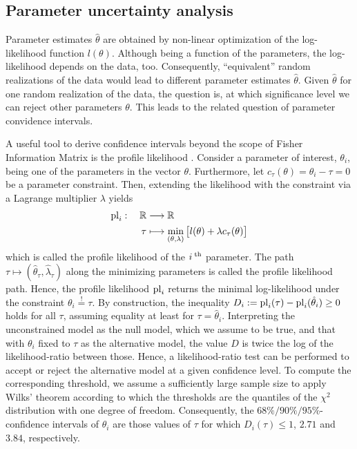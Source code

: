 \documentclass[article]{jss}
\begin{document}

\subsection{Parameter uncertainty analysis}

Parameter estimates $\hat \theta$  are obtained by non-linear optimization of the log-likelihood function $l(\theta)$. Although being a function of the parameters,  the log-likelihood depends on the data, too. Consequently, ``equivalent'' random realizations of the data would lead to different parameter estimates $\hat\theta$. Given $\hat\theta$ for one random realization of the data, the question is, at which significance level we can reject other parameters $\theta$. This leads to the related question of parameter convidence intervals.

A useful tool to derive confidence intervals beyond the scope of Fisher Information Matrix is the profile likelihood \citep{venzon1988method, murphy2000profile}. Consider a parameter of interest, $\theta_i$, being one of the parameters in the vector $\theta$. Furthermore, let $c_{\tau}(\theta) = \theta_i - \tau = 0$ be a parameter constraint.
Then, extending the likelihood with the constraint via a Lagrange multiplier $\lambda$ yields
\begin{align}
\begin{aligned}
{\rm pl}_i:\quad \mathbb R & \longrightarrow \mathbb R\\
\tau & \longmapsto \min_{(\theta, \lambda)} \big[ l(\theta) + \lambda c_{\tau}(\theta) \big]
\end{aligned}
\label{eq:pl}
\end{align}
which is called the profile likelihood of the $i^{\;\rm th}$ parameter. The path $\tau \mapsto (\hat\theta_{\tau}, \hat\lambda_{\tau})$ along the minimizing parameters is called the profile likelihood path. Hence, the profile likelihood ${\rm pl}_i$ returns the minimal log-likelihood under the constraint $\theta_i \stackrel{!}{=} \tau$. By construction, the inequality $D_i := {\rm pl}_i(\tau) - {\rm pl}_i(\hat \theta_i) \geq 0$ holds for all $\tau$, assuming equality at least for $\tau = \hat\theta_i$. Interpreting the unconstrained model as the null model, which we assume to be true, and that with $\theta_i$ fixed to $\tau$ as the alternative model, the value $D$ is twice the log of the likelihood-ratio between those. Hence, a likelihood-ratio test can be performed to accept or reject the alternative model at a given confidence level. To compute the corresponding threshold, we assume a sufficiently large sample size to apply Wilks' theorem according to which the thresholds are the quantiles of the $\chi^2$ distribution with one degree of freedom. Consequently, the $68\%/90\%/95\%$-confidence intervals of $\theta_i$ are those values of $\tau$ for which $D_i(\tau) \leq 1$, $2.71$ and $3.84$, respectively.
\end{document}
